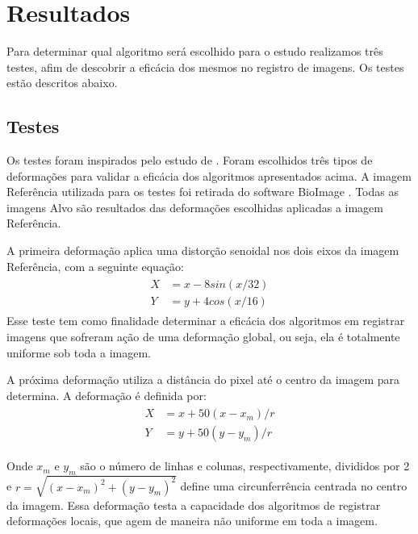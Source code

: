 \chapter{Resultados}
\label{cap:resultados}
	Para determinar qual algoritmo será escolhido para o estudo realizamos três testes, afim
de descobrir a eficácia dos mesmos no registro de imagens. Os testes estão descritos abaixo.

\section{Testes}
	Os testes foram inspirados pelo estudo de \cite{zagorchev2006comparative}. Foram escolhidos três tipos
de deformações para validar a eficácia dos algoritmos apresentados acima. A imagem Referência utilizada para os
testes foi retirada do software BioImage \cite{papademetris2005bioimage}. Todas as imagens Alvo são resultados
das deformações escolhidas aplicadas a imagem Referência.

	A primeira deformação aplica uma distorção senoidal nos dois eixos da imagem Referência, com a
seguinte equação:
\begin{align} \label{math:sin}
\begin{split}
	X &= x - 8sin(x/32) \\
	Y &= y + 4cos(x/16)
\end{split}  	
\end{align}
	Esse teste tem como finalidade determinar a eficácia dos algoritmos em registrar imagens que sofreram
ação de uma deformação global, ou seja, ela é totalmente uniforme sob toda a imagem.

	A próxima deformação utiliza a distância do pixel até o centro da imagem para determina. A deformação
é definida por:
\begin{align} \label{math:dist}
\begin{split}
	X &= x + 50(x-x_m)/r \\
	Y &= y + 50(y-y_m)/r 
\end{split} 
\end{align}

Onde $x_m$ e $y_m$ são o número de linhas e colunas, respectivamente, divididos por 2 e $r = \sqrt{(x-x_m)^2 + (y-y_m)^2}$
define uma circunferrência centrada no centro da imagem. Essa deformação testa a capacidade dos algoritmos de registrar
deformações locais, que agem de maneira não uniforme em toda a imagem.

